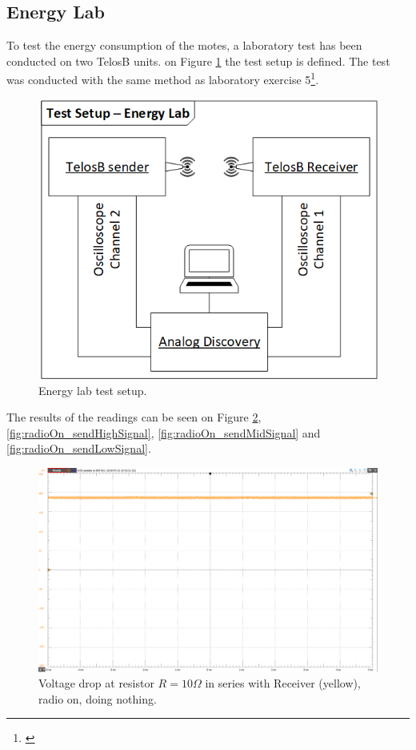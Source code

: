 \subsection{Energy Lab}\label{sc:energylab}

To test the energy consumption of the motes, a laboratory test has been conducted on two TelosB units. on Figure \ref{fig:energyLab_testSetup} the test setup is defined. The test was conducted with the same method as laboratory exercise 5\footnote{\cite{Madsen}}.

\begin{figure}[h]
	\centering
	\includegraphics[width=0.8\linewidth]{implementation/energylab/fig/energyLab_testSetup.png}
	\caption{Energy lab test setup.}
	\label{fig:energyLab_testSetup}
\end{figure}

\noindent The results of the readings can be seen on Figure \ref{fig:radioOn_idle}, \ref{fig:radioOn_sendHighSignal}, \ref{fig:radioOn_sendMidSignal} and \ref{fig:radioOn_sendLowSignal}.

\begin{figure}[h]
	\centering
	\includegraphics[width=0.8\linewidth]{implementation/energylab/fig/radioOn_idle.png}
	\caption{Voltage drop at resistor $R=10\Omega$ in series with Receiver (yellow), radio on, doing nothing.}
	\label{fig:radioOn_idle}
\end{figure}

